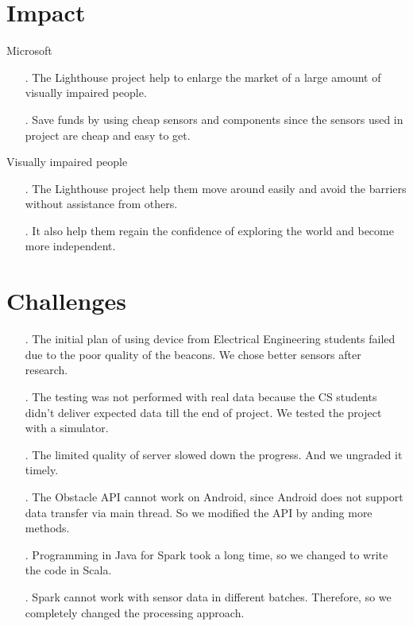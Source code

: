\documentclass[prodmode,acmtosem]{acmsmall} %
\begin{document}
\section{Impact}
Microsoft
\begin{itemize}
\item[.] The Lighthouse project help to enlarge the market of a large amount of visually impaired people.
\item[.] Save funds by using cheap sensors and components since the sensors used in project are cheap and easy to get.
\end{itemize}
Visually impaired people
\begin{itemize}
\item[.] The Lighthouse project help them move around easily and avoid the barriers without assistance from others.
\item[.] It also help them regain the confidence of exploring the world and become more independent.
\end{itemize}

\section{Challenges}
\begin{itemize}
\item[.] The initial plan of using device from Electrical Engineering students failed due to the poor quality of the beacons. We chose better sensors after research.
\item[.] The testing was not performed with real data because the CS students didn't deliver expected data till the end of project. We tested the project with a simulator.
\item[.] The limited quality of server slowed down the progress. And we ungraded it timely.
\item[.] The Obstacle API cannot work on Android, since Android does not support data transfer via main thread. So we modified the API by anding more methods.
\item[.] Programming in Java for Spark took a long time, so we changed to write the code in Scala.
\item[.] Spark cannot work with sensor data in different batches. Therefore, so we completely changed the processing approach.
\end{itemize}
\end{document}
